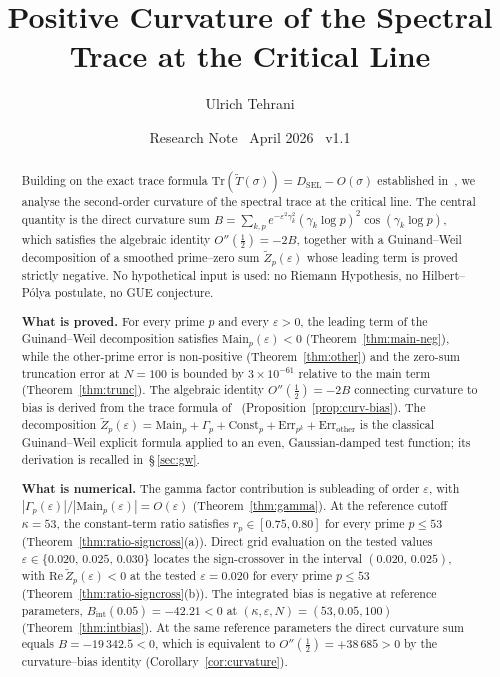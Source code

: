 \documentclass[11pt]{article}
\title{\vspace{-1.5em}\bfseries Positive Curvature of the Spectral Trace
at the Critical Line}
\author{Ulrich Tehrani}
\date{Research Note \textperiodcentered\ April 2026
      \textperiodcentered\ v1.1}
\newcommand{\Tt}{\widetilde{T}}
\newcommand{\Zt}{\widetilde{Z}}
\newcommand{\DSEL}{D_{\mathrm{SEL}}}
\begin{document}
\maketitle

\begin{abstract}
Building on the exact trace formula $\mathrm{Tr}(\Tt(\sigma))=\DSEL-O(\sigma)$
established in~\cite{Paper5}, we analyse the second-order curvature of the
spectral trace at the critical line.
The central quantity is the direct curvature sum
$B=\sum_{k,p} e^{-\varepsilon^2\gamma_k^2}(\gamma_k\log p)^2\cos(\gamma_k\log p)$,
which satisfies the algebraic identity $O''(\tfrac12)=-2B$, together with a
Guinand--Weil decomposition of a smoothed prime--zero sum $\Zt_p(\varepsilon)$
whose leading term is proved strictly negative.
No hypothetical input is used: no Riemann Hypothesis, no Hilbert--P\'olya
postulate, no GUE conjecture.

\textbf{What is proved.}
For every prime $p$ and every $\varepsilon>0$, the leading term of the
Guinand--Weil decomposition satisfies
$\mathrm{Main}_p(\varepsilon)<0$ (Theorem~\ref{thm:main-neg}), while the
other-prime error is non-positive
(Theorem~\ref{thm:other}) and the zero-sum truncation error at $N=100$
is bounded by $3\times 10^{-61}$ relative to the main term
(Theorem~\ref{thm:trunc}).
The algebraic identity $O''(\tfrac12)=-2B$ connecting curvature to bias
is derived from the trace formula of~\cite{Paper5}
(Proposition~\ref{prop:curv-bias}).
The decomposition
$\Zt_p(\varepsilon)=\mathrm{Main}_p+\Gamma_p+\mathrm{Const}_p
+\mathrm{Err}_{p^k}+\mathrm{Err}_{\mathrm{other}}$
is the classical Guinand--Weil explicit formula applied to an even,
Gaussian-damped test function; its derivation is recalled in~\S\,\ref{sec:gw}.

\textbf{What is numerical.}
The gamma factor contribution is subleading of order $\varepsilon$,
with $|\Gamma_p(\varepsilon)|/|\mathrm{Main}_p(\varepsilon)|=O(\varepsilon)$
(Theorem~\ref{thm:gamma}).
At the reference cutoff $\kappa=53$, the constant-term ratio satisfies
$r_p\in[0.75,0.80]$ for every prime $p\le 53$
(Theorem~\ref{thm:ratio-signcross}(a)).
Direct grid evaluation on the tested values
$\varepsilon\in\{0.020,\,0.025,\,0.030\}$ locates the sign-crossover
in the interval $(0.020,\,0.025)$, with
$\mathrm{Re}\,\Zt_p(\varepsilon)<0$ at the tested $\varepsilon=0.020$
for every prime $p\le 53$ (Theorem~\ref{thm:ratio-signcross}(b)).
The integrated bias is negative at reference parameters,
$B_{\mathrm{int}}(0.05)=-42.21<0$ at
$(\kappa,\varepsilon,N)=(53,0.05,100)$ (Theorem~\ref{thm:intbias}).
At the same reference parameters the direct curvature sum equals
$B=-19\,342.5<0$, which is equivalent to
$O''(\tfrac12)=+38\,685>0$ by the curvature--bias identity
(Corollary~\ref{cor:curvature}).


\end{abstract}
\end{document}
